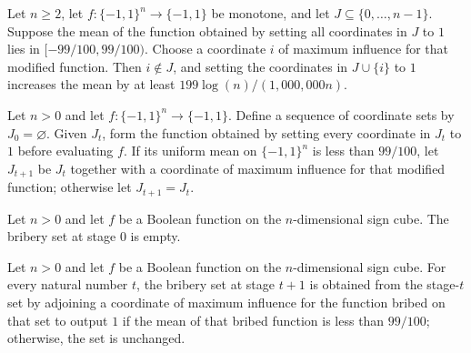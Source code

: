 \begin{theorem}
\label{FABL.maximumInfluenceCoordinate_bribery_step}
\leanok
{}
Let $n\ge 2$, let $f:\{-1,1\}^n\to\{-1,1\}$ be monotone, and let
$J\subseteq\{0,\ldots,n-1\}$. Suppose the mean of the function obtained by setting all
coordinates in $J$ to $1$ lies in $[-99/100,99/100)$. Choose a coordinate $i$ of maximum
influence for that modified function. Then $i\notin J$, and setting the coordinates in
$J\cup\{i\}$ to $1$ increases the mean by at least $199\log(n)/(1{,}000{,}000n)$.
\end{theorem}

\begin{definition}
\label{FABL.briberySets}
\leanok
{}
Let $n>0$ and let $f:\{−1,1\}^n\to\{−1,1\}$. Define a sequence of coordinate sets by
$J_0=\varnothing$. Given $J_t$, form the function obtained by setting every coordinate
in $J_t$ to $1$ before evaluating $f$. If its uniform mean on $\{−1,1\}^n$ is less than
$99/100$, let $J_{t+1}$ be $J_t$ together with a coordinate of maximum influence for
that modified function; otherwise let $J_{t+1}=J_t$.
\end{definition}

\begin{theorem}
\label{FABL.briberySets_zero}
\leanok
{}
Let $n>0$ and let $f$ be a Boolean function on the $n$-dimensional sign cube. The
bribery set at stage $0$ is empty.
\end{theorem}

\begin{theorem}
\label{FABL.briberySets_succ}
\leanok
{}
Let $n>0$ and let $f$ be a Boolean function on the $n$-dimensional sign cube. For every
natural number $t$, the bribery set at stage $t+1$ is obtained from the stage-$t$ set by
adjoining a coordinate of maximum influence for the function bribed on that set to
output $1$ if the mean of that bribed function is less than $99/100$; otherwise, the set
is unchanged.
\end{theorem}

